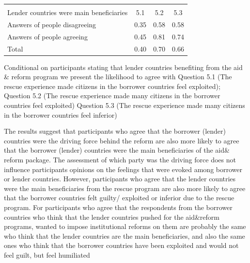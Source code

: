 \begin{table}[h!]
   \begin{center}
\begin{tabular}{l*{1}{ccc}}
\hline\hline
                    &\multicolumn{3}{c}{}                  \\
Lender countries were main beneficiaries                    &  5.1 &  5.2 &  5.3 \\
\hline
Answers of people disagreeing           &        0.35&        0.58&        0.58\\
Answers of people agreeing                   &        0.45&        0.81&        0.74\\
\hline
Total               &        0.40&        0.70&        0.66\\
\hline\hline
\end{tabular}
\end{center} 
\begin{tablenotes}
\item \tiny
Conditional on participants stating that lender countries benefiting from the aid & reform program we present the likelihood to agree with Question 5.1 (The rescue experience made citizens in the borrower countries feel exploited); Question 5.2 (The rescue experience made many citizens in the borrower countries feel exploited) Question 5.3 (The rescue experience made many citizens in the borrower countries feel inferior)
\end{tablenotes}
\end{table}
The results suggest that participants who agree that the borrower (lender) countries were the driving force behind the reform are also more likely to agree that the borrower (lender) countries were the main beneficiaries of the aid& reform package. The assessment of which party was the driving force does not influence participants opinions on the feelings that were evoked among borrower or lender countries. However, participants who agree that the lender countries were the main beneficiaries from the rescue program are also more likely to agree that the borrower countries felt guilty/ exploited or inferior due to the rescue program. For participants who agree that the 
respondents from the borrower countries who think that the lender countries
pushed for the aid\&reform programs, wanted to impose institutional reforms
on them are probably the same who think that the lender countries are the
main beneficiaries, and also the same ones who think that the borrower
countries have been exploited and would not feel guilt, but feel humiliated
